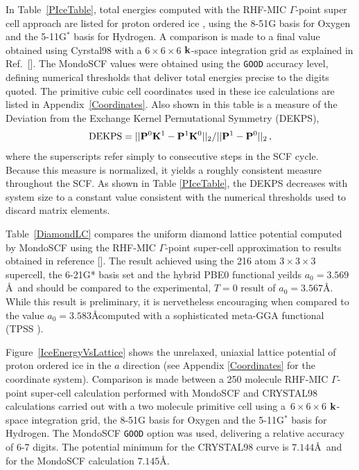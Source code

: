 \documentclass[prb,aps,nobibnotes,twocolumn,doublespace,twocolumngrid,superbib,showpacs]{revtex4}
\begin{document}
In Table~\ref{PIceTable}, total energies computed with the RHF-MIC $\Gamma$-point
super cell approach are listed for proton ordered ice \cite{SCasassa97}, using the 8-51G basis 
for Oxygen and the 5-11G$^*$ basis for Hydrogen.  A comparison is made to a final 
value obtained using {\sc Cyrstal98} with a $6\times6\times6$ ${\bf k}$-space integration grid
as explained in Ref.~[].  The {\sc MondoSCF} values were obtained 
using the {\tt GOOD} accuracy level, defining numerical thresholds that deliver total energies
precise to the digits quoted.
The primitive cubic cell coordinates used in these ice calculations are listed in Appendix~\ref{Coordinates}.   
Also shown in this table is a measure of the 
Deviation from the Exchange Kernel Permutational Symmetry (DEKPS),
\begin{equation}
{\rm DEKPS} = || {\bf P}^0 {\bf K}^1-{\bf P}^1 {\bf K}^0 ||_2/|| {\bf P}^1 - {\bf P}^0||_2 \, ,
\end{equation}
where the superscripts refer simply to consecutive steps in the SCF cycle.  Because this measure
is normalized, it yields a roughly consistent measure throughout the SCF.  As shown in Table \ref{PIceTable},
the DEKPS decreases with system size to a constant value consistent with the numerical thresholds used to 
discard matrix elements.   

Table~\ref{DiamondLC}  compares the uniform diamond lattice potential computed 
by MondoSCF using the RHF-MIC $\Gamma$-point super-cell approximation to results obtained in 
reference [].  The result achieved using the 216 atom $3 \times 3 \times 3$ 
supercell, the 6-21G* basis set and the hybrid PBE0 functional yeilds $a_0=3.569$\AA~and should be
compared to the experimental, $T=0$ result of $a_0=3.567$\AA.  While this result is preliminary, 
it is nervetheless encouraging when compared to the value $a_0=3.583$\AA computed with a sophisticated 
meta-GGA functional (TPSS \cite{JTao03}).

Figure~\ref{IceEnergyVsLattice} shows the unrelaxed, uniaxial lattice potential of 
proton ordered ice \cite{SCasassa97} in the $a$ direction (see Appendix \ref{Coordinates} 
for the coordinate system).  Comparison is made between a 250 molecule RHF-MIC $\Gamma$-point 
super-cell calculation performed with {\sc MondoSCF} and {\sc CRYSTAL98} calculations carried 
out with a two molecule primitive cell using a~$6\times6\times6$ ${\bf k}$-space integration grid, 
the 8-51G basis for Oxygen and the 5-11G${^*}$ basis for Hydrogen.  The {\sc MondoSCF} {\tt GOOD} 
option was used, delivering a relative accuracy of 6-7 digits. The potential minimum for the 
{\sc CRYSTAL98} curve is $7.144$\AA~and  for the {\sc MondoSCF} calculation $7.145$\AA.
\end{document}
